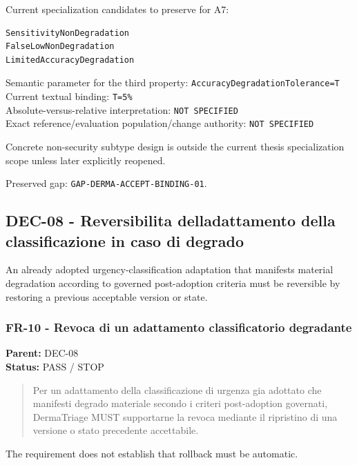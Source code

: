\documentclass[11pt,a4paper]{article}
\begin{document}
Current specialization candidates to preserve for A7:

\begin{verbatim}
SensitivityNonDegradation
FalseLowNonDegradation
LimitedAccuracyDegradation
\end{verbatim}

Semantic parameter for the third property:
\texttt{AccuracyDegradationTolerance=T}\\
Current textual binding: \texttt{T=5\%}\\
Absolute-versus-relative interpretation: \texttt{NOT\ SPECIFIED}\\
Exact reference/evaluation population/change authority:
\texttt{NOT\ SPECIFIED}

Concrete non-security subtype design is outside the current thesis
specialization scope unless later explicitly reopened.

Preserved gap: \texttt{GAP-DERMA-ACCEPT-BINDING-01}.

\subsection{DEC-08 - Reversibilita\textquotesingle{}
dell\textquotesingle adattamento della classificazione in caso di
degrado}\label{dec-08---reversibilita-delladattamento-della-classificazione-in-caso-di-degrado}

An already adopted urgency-classification adaptation that manifests
material degradation according to governed post-adoption criteria must
be reversible by restoring a previous acceptable version or state.

\subsubsection{FR-10 - Revoca di un adattamento classificatorio
degradante}\label{fr-10---revoca-di-un-adattamento-classificatorio-degradante}

\textbf{Parent:} DEC-08\\
\textbf{Status:} PASS / STOP

\begin{quote}
Per un adattamento della classificazione di urgenza
gia\textquotesingle{} adottato che manifesti degrado materiale secondo i
criteri post-adoption governati, DermaTriage MUST supportarne la revoca
mediante il ripristino di una versione o stato precedente accettabile.
\end{quote}

The requirement does not establish that rollback must be automatic.
\end{document}
